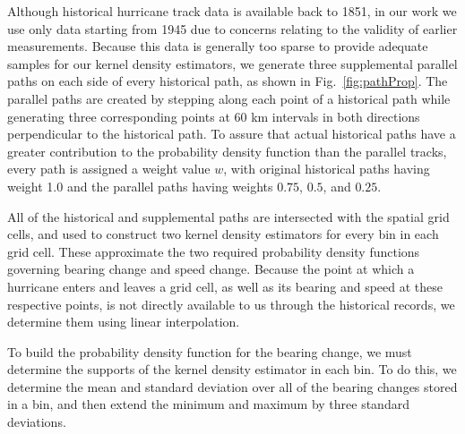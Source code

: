 \documentclass[journal]{vgtc}                %
\begin{document}
  Although historical hurricane track data is available back to 1851, in our work we use only data starting from 1945 due to concerns relating to the validity of earlier measurements.  Because this data is generally too sparse to provide adequate samples for our kernel density estimators, we generate three supplemental parallel paths on each side of every historical path, as shown in Fig.~\ref{fig:pathProp}.  The parallel paths are created by stepping along each point of a historical path while generating three corresponding points at 60 km intervals in both directions perpendicular to the historical path.
To assure that actual historical paths have a greater contribution to the probability density function than 
the parallel tracks, every path is assigned a weight value $w$, with original historical paths having weight 1.0 and the parallel paths having weights $0.75$, $0.5$, and $0.25$.

All of the historical and supplemental paths are intersected with the spatial grid cells, and used to construct two kernel density estimators for every bin in each grid cell.  These approximate the two required probability density functions governing bearing change and speed change. Because the point at which a hurricane enters and leaves a grid cell, as well as its bearing and speed at these respective points, is not directly available to us through the historical records, we determine them using linear interpolation. 

To build the probability density function for the bearing change, we must determine the supports of the kernel density estimator in each bin.  To do this, we determine the mean and standard deviation over all of the bearing changes stored in a bin, and then extend the minimum and maximum by three standard deviations.
\end{document}
